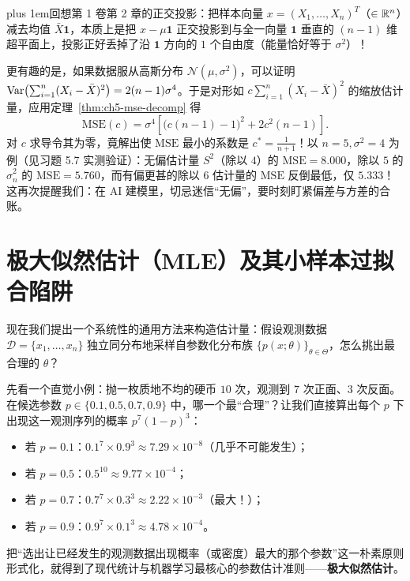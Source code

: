 \begin{remark}
{\rightskip=0pt plus 1em\relax 回想第 1 卷第 2 章的正交投影：把样本向量 $x = (X_1,\dots,X_n)^T$（$\in \mathbb{R}^n$）减去均值 $\bar{X}\mathbf{1}$，本质上是把 $x - \mu\mathbf{1}$ 正交投影到与全一向量 $\mathbf{1}$ 垂直的 $(n-1)$ 维超平面上，投影正好丢掉了沿 $\mathbf{1}$ 方向的 $1$ 个自由度（能量恰好等于 $\sigma^2$）！\par}

更有趣的是，如果数据服从高斯分布 $\mathcal{N}(\mu, \sigma^2)$，可以证明 $\operatorname{Var}\!\left(\sum_{i=1}^n (X_i-\bar{X})^2\right) = 2(n-1)\sigma^4$。于是对形如 $c\sum_{i=1}^n (X_i-\bar{X})^2$ 的缩放估计量，应用定理~\ref{thm:ch5-mse-decomp} 得
\[
  \mathrm{MSE}(c) = \sigma^4\!\left[\big(c(n-1) - 1\big)^2 + 2c^2(n-1)\right].
\]
对 $c$ 求导令其为零，竟解出使 $\mathrm{MSE}$ 最小的系数是 $c^* = \frac{1}{n+1}$！以 $n=5, \sigma^2=4$ 为例（见习题 5.7 实测验证）：无偏估计量 $S^2$（除以 $4$）的 $\mathrm{MSE} = 8.000$，除以 $5$ 的 $\hat{\sigma}_n^2$ 的 $\mathrm{MSE} = 5.760$，而有偏更甚的除以 $6$ 估计量的 $\mathrm{MSE}$ 反倒最低，仅 $5.333$！这再次提醒我们：在 AI 建模里，切忌迷信“无偏”，要时刻盯紧偏差与方差的合账。
\end{remark}

\section{极大似然估计（MLE）及其小样本过拟合陷阱}
\label{sec:ch5-mle}

现在我们提出一个系统性的通用方法来构造估计量：假设观测数据 $\mathcal{D} = \{x_1, \dots, x_n\}$ 独立同分布地采样自参数化分布族 $\{p(x; \theta)\}_{\theta \in \Theta}$，怎么挑出最合理的 $\theta$？

先看一个直觉小例：抛一枚质地不均的硬币 $10$ 次，观测到 $7$ 次正面、$3$ 次反面。在候选参数 $p \in \{0.1,\allowbreak 0.5,\allowbreak 0.7,\allowbreak 0.9\}$ 中，哪一个最“合理”？让我们直接算出每个 $p$ 下出现这一观测序列的概率 $p^7(1-p)^3$：
\begin{itemize}
  \item 若 $p = 0.1$：$0.1^7 \times 0.9^3 \approx 7.29 \times 10^{-8}$（几乎不可能发生）；
  \item 若 $p = 0.5$：$0.5^{10} \approx 9.77 \times 10^{-4}$；
  \item 若 $p = 0.7$：$0.7^7 \times 0.3^3 \approx 2.22 \times 10^{-3}$（最大！）；
  \item 若 $p = 0.9$：$0.9^7 \times 0.1^3 \approx 4.78 \times 10^{-4}$。
\end{itemize}
把“选出让已经发生的观测数据出现概率（或密度）最大的那个参数”这一朴素原则形式化，就得到了现代统计与机器学习最核心的参数估计准则——\textbf{极大似然估计}。

